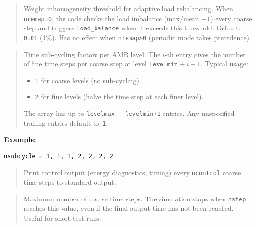 \label{param:remap_thresh}

\begin{quote}
Weight inhomogeneity threshold for adaptive load rebalancing.
When \texttt{nremap=0}, the code checks the load imbalance
(max/mean $-1$) every coarse step and triggers \texttt{load\_balance}
when it exceeds this threshold.
Default: \texttt{0.01} (1\%).
Has no effect when \texttt{nremap>0} (periodic mode takes precedence).
\end{quote}

\label{param:nsubcycle}

\begin{quote}
Time sub-cycling factors per AMR level.  The $i$-th entry gives the
number of fine time steps per coarse step at level
$\texttt{levelmin}+i-1$.  Typical usage:
\begin{itemize}[nosep]
  \item \texttt{1} for coarse levels (no sub-cycling).
  \item \texttt{2} for fine levels (halve the time step at each
        finer level).
\end{itemize}
The array has up to \texttt{levelmax\,--\,levelmin+1} entries.  Any
unspecified trailing entries default to~\texttt{1}.
\end{quote}

\noindent\textcolor{apidefault}{\textsf{\textbf{Example:}}}
\begin{lstlisting}
nsubcycle = 1, 1, 1, 2, 2, 2, 2
\end{lstlisting}

\label{param:ncontrol}

\begin{quote}
Print control output (energy diagnostics, timing) every
\texttt{ncontrol} coarse time steps to standard output.
\end{quote}

\label{param:nstepmax}

\begin{quote}
Maximum number of coarse time steps.  The simulation stops when
\texttt{nstep} reaches this value, even if the final output time has
not been reached.  Useful for short test runs.
\end{quote}

